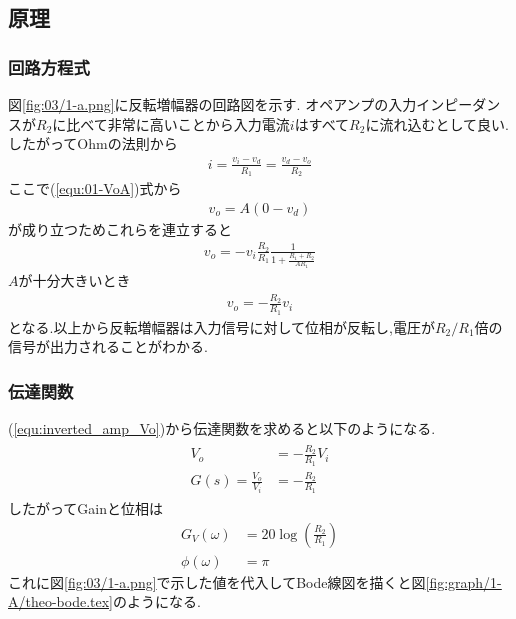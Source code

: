 \subsection{原理}
\subsubsection{回路方程式}
図\ref{fig:03/1-a.png}に反転増幅器の回路図を示す.
オペアンプの入力インピーダンスが$R_2$に比べて非常に高いことから入力電流$i$はすべて$R_2$に流れ込むとして良い.
したがってOhmの法則から
\begin{align}
  \label{equ:inv_amp_circuit_eq}
  i=\frac{v_i-v_d}{R_1}=\frac{v_d-v_o}{R_2}
\end{align}
ここで(\ref{equ:01-VoA})式から
\begin{align}
  v_o=A(0-v_d)
\end{align}
が成り立つためこれらを連立すると
\begin{align}
  v_o=-v_i\frac{R_2}{R_1}\frac{1}{1+\frac{R_1+R_2}{AR_1}}
\end{align}
$A$が十分大きいとき
\begin{align}
  \label{equ:inverted_amp_Vo}
  v_o=-\frac{R_2}{R_1}v_i
\end{align}
となる.以上から反転増幅器は入力信号に対して位相が反転し,電圧が$R_2/R_1$倍の信号が出力されることがわかる.
\subsubsection{伝達関数}
(\ref{equ:inverted_amp_Vo})から伝達関数を求めると以下のようになる.
\begin{align}
  \begin{split}
    \label{equ:inv_amp_transform_eq}
    V_o&=-\frac{R_2}{R_1}V_i\\
    G(s)=\frac{V_o}{V_i}&=-\frac{R_2}{R_1}
  \end{split}
\end{align}
したがってGainと位相は
\begin{align}
  \label{equ:gain_phase}
  G_V(\omega)&=20\log\left(\frac{R_2}{R_1}\right)\\
  \phi(\omega)&=\pi
\end{align}
これに図\ref{fig:03/1-a.png}で示した値を代入してBode線図を描くと図\ref{fig:graph/1-A/theo-bode.tex}のようになる.
